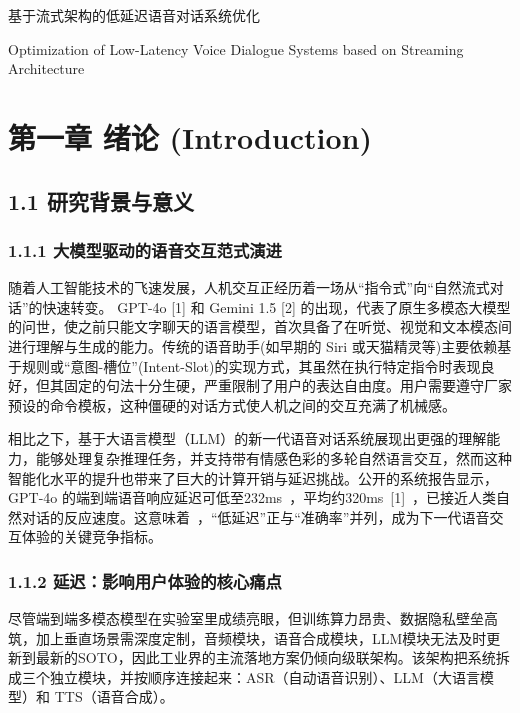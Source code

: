 \documentclass[UTF8,a4paper,12pt]{ctexart}
\begin{document}
\begin{center}
\LARGE 基于流式架构的低延迟语音对话系统优化
\end{center}


\begin{center}
\LARGE Optimization of Low-Latency Voice Dialogue Systems based on Streaming Architecture
\end{center}


\section*{第一章 绪论 (Introduction)}


\subsection*{1.1 研究背景与意义}


\subsubsection*{1.1.1 大模型驱动的语音交互范式演进}


随着人工智能技术的飞速发展，人机交互正经历着一场从“指令式”向“自然流式对话”的快速转变。 GPT-4o [1] 和 Gemini 1.5 [2] 的出现，代表了原生多模态大模型的问世，使之前只能文字聊天的语言模型，首次具备了在听觉、视觉和文本模态间进行理解与生成的能力。传统的语音助手(如早期的 Siri 或天猫精灵等)主要依赖基于规则或“意图-槽位”(Intent-Slot)的实现方式，其虽然在执行特定指令时表现良好，但其固定的句法十分生硬，严重限制了用户的表达自由度。用户需要遵守厂家预设的命令模板，这种僵硬的对话方式使人机之间的交互充满了机械感。

相比之下，基于大语言模型（LLM）的新一代语音对话系统展现出更强的理解能力，能够处理复杂推理任务，并支持带有情感色彩的多轮自然语言交互，然而这种智能化水平的提升也带来了巨大的计算开销与延迟挑战。公开的系统报告显示，GPT-4o 的端到端语音响应延迟可低至232ms ，平均约320ms [1] ，已接近人类自然对话的反应速度。这意味着 ，“低延迟”正与“准确率”并列，成为下一代语音交互体验的关键竞争指标。

\subsubsection*{1.1.2 延迟：影响用户体验的核心痛点}


尽管端到端多模态模型在实验室里成绩亮眼，但训练算力昂贵、数据隐私壁垒高筑，加上垂直场景需深度定制，音频模块，语音合成模块，LLM模块无法及时更新到最新的SOTO，因此工业界的主流落地方案仍倾向级联架构。该架构把系统拆成三个独立模块，并按顺序连接起来：ASR（自动语音识别）、LLM（大语言模型）和 TTS（语音合成）。
\end{document}
